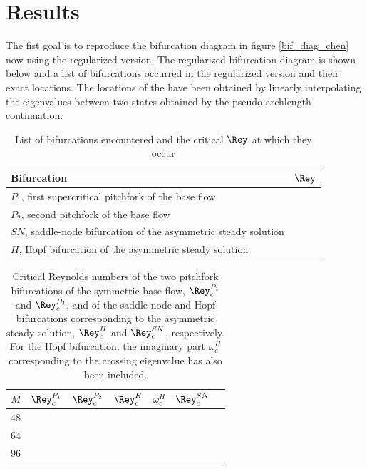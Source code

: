 
\section{Results} \label{sec:resdisc}

The fist goal is to reproduce the bifurcation diagram in figure
\ref{bif_diag_chen} now using the regularized version. The regularized
bifurcation diagram is shown below and a list of bifurcations occurred in the
regularized version and their exact locations. The locations of the have been
obtained by linearly interpolating the eigenvalues between two states obtained
by the pseudo-archlength continuation.

\begin{table}[h!]
  \caption{List of bifurcations encountered and the critical $\Rey$ at which they
    occur}
  \label{tab:bif_points}
\begin{tabular}{l c}
Bifurcation & $\Rey$\\
\hline
$P_1$, first supercritical pitchfork of the base flow & \\
$P_2$, second pitchfork of the base flow & \\
$SN$, saddle-node bifurcation of the asymmetric steady solution&  \\
$H$, Hopf bifurcation of the asymmetric steady solution&  \\
\end{tabular}
\end{table}

\begin{table}[h!]
  \caption{Critical Reynolds numbers of the two
    pitchfork bifurcations of the symmetric base flow, $\Rey_c^{P_1}$
    and $\Rey_c^{P_2}$, and of the saddle-node and Hopf bifurcations
    corresponding to the asymmetric steady solution, $\Rey_c^{H}$ and
    $\Rey_c^{SN}$, respectively. For the Hopf bifurcation, the imaginary part
    $\omega_c^{H}$ corresponding to the crossing eigenvalue has also been
    included.}
  \label{tab:re_crit}
\begin{tabular}{crrrrrr}
$M$ & $\Rey_c^{P_1}$ & $\Rey_c^{P_2}$ & $\Rey_c^{H}$ &  $\omega_c^{H}$ & $\Rey_c^{SN}$  \\
\hline
$48$ &  & &          &          &   \\
$64$ &  & &          &          &   \\
$96$ &  & &          &          &   \\
\end{tabular}
\end{table}

